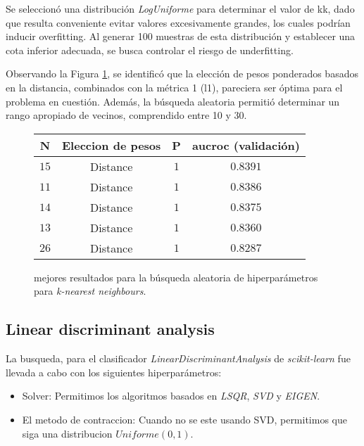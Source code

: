 Se seleccionó una distribución \textit{LogUniforme} para determinar el valor de kk, dado que resulta conveniente evitar valores excesivamente grandes, los cuales podrían inducir overfitting. Al generar 100 muestras de esta distribución y establecer una cota inferior adecuada, se busca controlar el riesgo de underfitting.

Observando la Figura \ref{knn}, se identificó que la elección de pesos ponderados basados en la distancia, combinados con la métrica 1 (l1), pareciera ser óptima para el problema en cuestión.
Además, la búsqueda aleatoria permitió determinar un rango apropiado de vecinos, comprendido entre 10 y 30.
\vspace{0.5em}
\begin{figure}[!htbp]
    \begin{center}
        \begin{tabular}{ |c|c|c|c| } 
         \hline
        N   & Eleccion de pesos & P  & aucroc (validación) \\
        \hline
        $15$             & Distance          &  $1$             & $0.8391$  \\ 
        $11$             & Distance          &  $1$             & $0.8386$  \\
        $14$             & Distance          &  $1$             & $0.8375$  \\ 
        $13$             & Distance          &  $1$             & $0.8360$  \\
        $26$             & Distance          &  $1$             & $0.8287$  \\ 
        \hline
        \end{tabular}
    \end{center}
    \caption{mejores resultados para la búsqueda aleatoria de hiperparámetros para \textit{k-nearest neighbours}.} \label{knn}
\end{figure}

\subsection{Linear discriminant analysis}
La busqueda, para el clasificador \textit{LinearDiscriminantAnalysis} de \textit{scikit-learn} fue llevada a cabo con los siguientes hiperparámetros: 

\begin{itemize}
    \item Solver: Permitimos los algoritmos basados en \textit{LSQR}, \textit{SVD} y \textit{EIGEN}.
    \item El metodo de contraccion: Cuando no se este usando SVD, permitimos que siga una distribucion $Uniforme(0,1)$.
\end{itemize}

